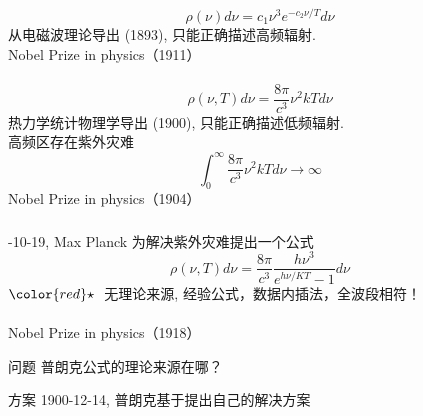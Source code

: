 \begin{frame} [t]
    \frametitle{}
    \emf[维恩公式：] 
    \begin{equation*}
        \rho(\nu) d \nu=c_{1} \nu^{3} e^{-c_{2} \nu / T} d \nu 
    \end{equation*}
    从电磁波理论导出 (1893), 只能正确描述高频辐射.\\ 
    {\color{deepblue} Nobel Prize in physics（1911）}\\
    ~~\\ 
    \emf[瑞-金公式:] 
    \begin{equation*}
        \rho(\nu, T) d \nu=\frac{8 \pi}{c^{3}} \nu^{2} k T d \nu 
    \end{equation*}
    热力学统计物理学导出 (1900), 只能正确描述低频辐射.\\ 
   {高频区存在紫外灾难} 
    \begin{equation*}
         \int_0 ^\infty \frac{8 \pi}{c^{3}} \nu^{2} k T d \nu \to \infty 
    \end{equation*}
    {\color{deepblue} Nobel Prize in physics（1904）}\\ \vspace{0.3em}
\end{frame}

\begin{frame}
    \frametitle{}
    -10-19, Max Planck 为解决紫外灾难提出一个公式 
    \begin{equation}
        \boxed{\rho(\nu, T) d \nu=\frac{8 \pi}{c^{3}} \frac{h \nu^{3}}{e^{h \nu / K T}-1} d \nu}
    \end{equation}
    ${\color{red}\star}~$ 无理论来源, 经验公式，数据内插法，全波段相符！ \\
    ~~\\ 
    {\color{deepblue} Nobel Prize in physics（1918）}\\
\end{frame}

\begin{frame}
    \centering
    \begin{atcbox}{问题}
        普朗克公式的理论来源在哪？
    \end{atcbox}
    \begin{atcbox}{方案}
        1900-12-14, 普朗克基于\emf[能量子假说] 提出自己的解决方案
    \end{atcbox}
\end{frame}

